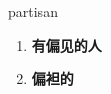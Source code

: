 
\begin{frame}
{\huge partisan}
\begin{center}
\begin{enumerate}\Large
  \item \textbf{有偏见的人}
  \item \textbf{偏袒的}
\end{enumerate}
\end{center}
\end{frame}
